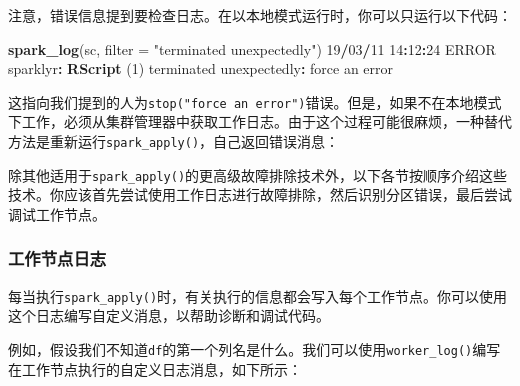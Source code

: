 \documentclass[
]{article}
\newenvironment{Shaded}{\begin{snugshade}}{\end{snugshade}}
\newcommand{\CommentTok}[1]{\textcolor[rgb]{0.56,0.35,0.01}{\textit{#1}}}
\newcommand{\ControlFlowTok}[1]{\textcolor[rgb]{0.13,0.29,0.53}{\textbf{#1}}}
\newcommand{\DataTypeTok}[1]{\textcolor[rgb]{0.13,0.29,0.53}{#1}}
\newcommand{\DecValTok}[1]{\textcolor[rgb]{0.00,0.00,0.81}{#1}}
\newcommand{\KeywordTok}[1]{\textcolor[rgb]{0.13,0.29,0.53}{\textbf{#1}}}
\newcommand{\NormalTok}[1]{#1}
\newcommand{\OperatorTok}[1]{\textcolor[rgb]{0.81,0.36,0.00}{\textbf{#1}}}
\newcommand{\StringTok}[1]{\textcolor[rgb]{0.31,0.60,0.02}{#1}}
\begin{document}
注意，错误信息提到要检查日志。在以本地模式运行时，你可以只运行以下代码：

\begin{Shaded}
\begin{Highlighting}[]
\KeywordTok{spark_log}\NormalTok{(sc, }\DataTypeTok{filter =} \StringTok{"terminated unexpectedly"}\NormalTok{)}
\DecValTok{19}\OperatorTok{/}\DecValTok{03}\OperatorTok{/}\DecValTok{11} \DecValTok{14}\OperatorTok{:}\DecValTok{12}\OperatorTok{:}\DecValTok{24}\NormalTok{ ERROR sparklyr}\OperatorTok{:}\StringTok{ }\KeywordTok{RScript}\NormalTok{ (}\DecValTok{1}\NormalTok{) terminated unexpectedly}\OperatorTok{:}
\StringTok{ }\NormalTok{force an error}
\end{Highlighting}
\end{Shaded}

这指向我们提到的人为\texttt{stop("force\ an\ error")}错误。但是，如果不在本地模式下工作，必须从集群管理器中获取工作日志。由于这个过程可能很麻烦，一种替代方法是重新运行\texttt{spark\_apply()}，自己返回错误消息：

\begin{Shaded}
\end{Shaded}

除其他适用于\texttt{spark\_apply()}的更高级故障排除技术外，以下各节按顺序介绍这些技术。你应该首先尝试使用工作日志进行故障排除，然后识别分区错误，最后尝试调试工作节点。

\hypertarget{ux5de5ux4f5cux8282ux70b9ux65e5ux5fd7}{%
\subsubsection{工作节点日志}\label{ux5de5ux4f5cux8282ux70b9ux65e5ux5fd7}}

每当执行\texttt{spark\_apply()}时，有关执行的信息都会写入每个工作节点。你可以使用这个日志编写自定义消息，以帮助诊断和调试代码。

例如，假设我们不知道\texttt{df}的第一个列名是什么。我们可以使用\texttt{worker\_log()}编写在工作节点执行的自定义日志消息，如下所示：
\end{document}
